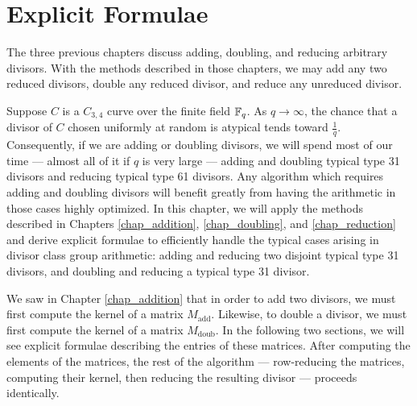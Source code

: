 
\section{Explicit Formulae}
\label{chap_typical_case}

The three previous chapters discuss adding, doubling, and reducing arbitrary divisors.
With the methods described in those chapters, we may add any two reduced divisors,
double any reduced divisor, and reduce any unreduced divisor.

Suppose $C$ is a $C_{3,4}$ curve over the finite field $\mathbb{F}_q$.
As $q \to \infty$, the chance that a divisor of $C$ chosen uniformly at random is atypical
tends toward $\frac 1 q$.
Consequently, if we are adding or doubling divisors,
we will spend most of our time ---
almost all of it if $q$ is very large ---
adding and doubling typical type 31 divisors and reducing typical type 61 divisors.
Any algorithm which requires adding and doubling divisors will benefit greatly from
having the arithmetic in those cases highly optimized.
In this chapter, we will apply the methods described in
Chapters \ref{chap_addition}, \ref{chap_doubling}, and \ref{chap_reduction}
and derive explicit formulae to efficiently handle
the typical cases arising in divisor class group arithmetic:
adding and reducing two disjoint typical type 31 divisors,
and doubling and reducing a typical type 31 divisor.

We saw in Chapter \ref{chap_addition} that in order to add two divisors,
we must first compute the kernel of a matrix $M_{\text{add}}$.
Likewise, to double a divisor, we must first compute the kernel of a matrix $M_{\text{doub}}$.
In the following two sections, we will see explicit formulae describing the entries of these matrices.
After computing the elements of the matrices,
the rest of the algorithm ---
row-reducing the matrices, computing their kernel, then reducing the resulting divisor ---
proceeds identically.

